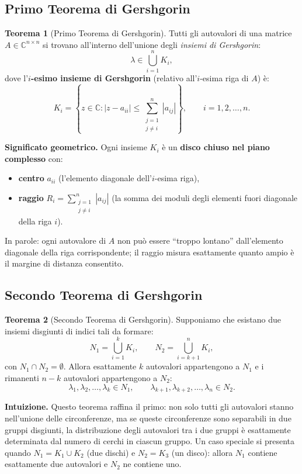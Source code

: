 \documentclass[a4paper,12pt]{article}
\theoremstyle{definition}
\newtheorem{teorema}{Teorema}[section]
\theoremstyle{remark}
\begin{document}
\subsection{Primo Teorema di Gershgorin}

\begin{teorema}[Primo Teorema di Gershgorin]
Tutti gli autovalori di una matrice $A \in \mathbb{C}^{n \times n}$ si trovano all'interno
dell'unione degli \emph{insiemi di Gershgorin}:
\[
  \lambda \in \bigcup_{i=1}^{n} K_i,
\]
dove l'\textbf{$i$-esimo insieme di Gershgorin} (relativo all'$i$-esima riga di $A$) è:
\[
  K_i = \left\{ z \in \mathbb{C} : |z - a_{ii}| \leq \sum_{\substack{j=1 \\ j \neq i}}^{n} |a_{ij}| \right\},
  \qquad i = 1, 2, \ldots, n.
\]
\end{teorema}

\noindent\textbf{Significato geometrico.} Ogni insieme $K_i$ è un \textbf{disco chiuso nel
piano complesso} con:
\begin{itemize}
  \item \textbf{centro} $a_{ii}$ (l'elemento diagonale dell'$i$-esima riga),
  \item \textbf{raggio} $\displaystyle R_i = \sum_{\substack{j=1 \\ j \neq i}}^{n} |a_{ij}|$
        (la somma dei moduli degli elementi fuori diagonale della riga $i$).
\end{itemize}
In parole: ogni autovalore di $A$ non può essere ``troppo lontano'' dall'elemento diagonale
della riga corrispondente; il raggio misura esattamente quanto ampio è il margine di distanza
consentito.

\subsection{Secondo Teorema di Gershgorin}

\begin{teorema}[Secondo Teorema di Gershgorin]
Supponiamo che esistano due insiemi disgiunti di indici tali da formare:
\[
  N_1 = \bigcup_{i=1}^{k} K_i, \qquad N_2 = \bigcup_{i=k+1}^{n} K_i,
\]
con $N_1 \cap N_2 = \emptyset$. Allora esattamente $k$ autovalori appartengono a $N_1$ e i
rimanenti $n - k$ autovalori appartengono a $N_2$:
\[
  \lambda_1, \lambda_2, \ldots, \lambda_k \in N_1,
  \qquad
  \lambda_{k+1}, \lambda_{k+2}, \ldots, \lambda_n \in N_2.
\]
\end{teorema}

\noindent\textbf{Intuizione.} Questo teorema raffina il primo: non solo tutti gli autovalori
stanno nell'unione delle circonferenze, ma se queste circonferenze sono separabili in due
gruppi disgiunti, la distribuzione degli autovalori tra i due gruppi è esattamente
determinata dal numero di cerchi in ciascun gruppo. Un caso speciale si presenta quando
$N_1 = K_1 \cup K_2$ (due dischi) e $N_2 = K_3$ (un disco): allora $N_1$ contiene
esattamente due autovalori e $N_2$ ne contiene uno.
\end{document}
